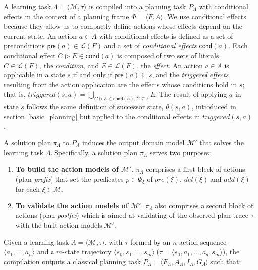 \documentclass[runningheads]{llncs}
\newcommand{\tup}[1]{{\langle #1 \rangle}}
\newcommand{\pre}{\mathsf{pre}}     %
\newcommand{\cond}{\mathsf{cond}}   %
\begin{document}
A learning task $\Lambda=\tup{\mathcal{M},\tau}$ is compiled into a planning task $P_{\Lambda}$ with conditional effects in the context of a planning frame $\Phi=\tup{F,A}$. We use conditional effects because they allow us to compactly define actions whose effects depend on the current state. An action $a\in A$ with conditional effects is defined as a set of preconditions $\pre(a)\in\mathcal{L}(F)$ and a set of {\em conditional effects} $\cond(a)$. Each conditional effect $C\rhd E\in\cond(a)$ is composed of two sets of literals $C\in\mathcal{L}(F)$, the {\em condition}, and $E\in\mathcal{L}(F)$, the {\em effect}. An action $a\in A$ is applicable in a state $s$ if and only if $\pre(a)\subseteq s$, and the {\em triggered effects} resulting from the action application are the effects whose conditions hold in $s$; that is, $triggered(s,a)=\bigcup\limits_{C\rhd E\in\cond(a),C\subseteq s} E$. The result of applying $a$ in state $s$ follows the same definition of successor state, $\theta(s,a)$, introduced in section \ref{basic_planning} but applied to the conditional effects in $triggered(s,a)$.


\vspace{0.25cm}

A solution plan $\pi_\Lambda$ to $P_{\Lambda}$ induces the output domain model $\mathcal{M}'$ that solves the learning task $\Lambda$. Specifically, a solution plan $\pi_\Lambda$ serves two purposes:

\begin{enumerate}
\item {\bf To build the action models of $\mathcal{M}'$}. $\pi_\Lambda$ comprises a first block of actions (plan {\em prefix}) that set the predicates $p\in \Psi_{\xi}$ of $pre(\xi)$, $del(\xi)$ and $add(\xi)$ for each $\xi\in\mathcal{M}$.
\item {\bf To validate the action models of $\mathcal{M}'$}. $\pi_\Lambda$ also comprises a second block of actions (plan {\em postfix}) which is aimed at validating of the observed plan trace $\tau$ with the built action models $\mathcal{M}'$.
\end{enumerate}

Given a learning task $\Lambda=\tup{\mathcal{M},\tau}$, with $\tau$ formed by an $n$-action sequence $\tup{a_1, \ldots, a_n}$ and a $m$-state trajectory $\tup{s_0, s_1, \ldots, s_m}$ ($\tau = \langle s_0, a_1, \ldots, a_n, s_m \rangle$), the compilation outputs a classical planning task $P_{\Lambda}=\tup{F_{\Lambda},A_{\Lambda},I_{\Lambda},G_{\Lambda}}$ such that:
\end{document}
